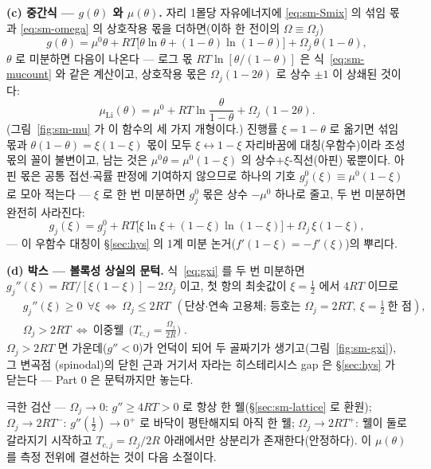 \textbf{(c) 중간식 --- $g(\theta)$ 와 $\mu(\theta)$.} 자리 1몰당 자유에너지에 \eqref{eq:sm-Smix} 의 섞임 몫과
\eqref{eq:sm-omega} 의 상호작용 몫을 더하면(이하 한 전이의 $\Omega\equiv\Omega_j$)
\begin{equation}
g(\theta)=\mu^0\theta+RT\big[\theta\ln\theta+(1-\theta)\ln(1-\theta)\big]+\Omega_j\,\theta(1-\theta),
\label{eq:sm-gtheta}
\end{equation}
$\theta$ 로 미분하면 다음이 나온다 --- 로그 몫 $RT\ln[\theta/(1-\theta)]$ 은 식~\eqref{eq:sm-mucount} 와 같은 계산이고,
상호작용 몫은 $\Omega_j(1-2\theta)$ 로 상수 $\pm1$ 이 상쇄된 것이다:
\begin{equation}
\mu_\mathrm{Li}(\theta)=\mu^0+RT\ln\frac{\theta}{1-\theta}+\Omega_j\,(1-2\theta).
\label{eq:mu}
\end{equation}
(그림~\ref{fig:sm-mu} 가 이 함수의 세 가지 개형이다.) 진행률 $\xi=1-\theta$ 로 옮기면 섞임 몫과
$\theta(1-\theta)=\xi(1-\xi)$ 몫이 모두 $\xi\leftrightarrow1-\xi$ 자리바꿈에 대칭(우함수)이라 조성 몫의 꼴이
불변이고, 남는 것은 $\mu^0\theta=\mu^0(1-\xi)$ 의 상수$+\xi$-직선(아핀) 몫뿐이다. 아핀 몫은 공통
접선$\cdot$곡률 판정에 기여하지 않으므로 하나의 기호 $g_j^0(\xi)\equiv\mu^0(1-\xi)$ 로 모아 적는다 ---
$\xi$ 로 한 번 미분하면 $g_j^0$ 몫은 상수 $-\mu^0$ 하나로 줄고, 두 번 미분하면 완전히 사라진다:
\begin{equation}
g_j(\xi)=g_j^0+RT\big[\xi\ln\xi+(1-\xi)\ln(1-\xi)\big]+\Omega_j\,\xi(1-\xi),
\label{eq:gxi}
\end{equation}
--- 이 우함수 대칭이 \S\ref{sec:hys} 의 1계 미분 논거($f'(1-\xi)=-f'(\xi)$)의 뿌리다.

\textbf{(d) 박스 --- 볼록성 상실의 문턱.} 식~\eqref{eq:gxi} 를 두 번 미분하면
$g_j''(\xi)=RT/[\xi(1-\xi)]-2\Omega_j$ 이고, 첫 항의 최솟값이 $\xi=\tfrac12$ 에서 $4RT$ 이므로
\begin{equation}
\boxed{\;
\begin{aligned}
&g_j''(\xi)\ge0\ \ \forall\xi\ \Longleftrightarrow\ \Omega_j\le2RT\ \ (\text{단상·연속 고용체; 등호는 }\Omega_j{=}2RT,\ \xi{=}\tfrac12\ \text{한 점}),\\
&\Omega_j>2RT\ \Longleftrightarrow\ \text{이중웰}\ \ \Big(T_{c,j}=\frac{\Omega_j}{2R}\Big)\;.
\end{aligned}}
\label{eq:sm-thresh}
\end{equation}
$\Omega_j>2RT$ 면 가운데($g''<0$)가 언덕이 되어 두 골짜기가 생기고(그림~\ref{fig:sm-gxi}), 그 변곡점
(spinodal)의 닫힌 근과 거기서 자라는 히스테리시스 gap 은 \S\ref{sec:hys} 가 닫는다 --- Part 0 은 문턱까지만
놓는다.
\begin{verifybox}
극한 검산 --- $\Omega_j\to0$: $g''\ge4RT>0$ 로 항상 한 웰(\S\ref{sec:sm-lattice} 로 환원);
$\Omega_j\to2RT^-$: $g''(\tfrac12)\to0^+$ 로 바닥이 평탄해지되 아직 한 웰; $\Omega_j\to2RT^+$: 웰이 둘로
갈라지기 시작하고 $T_{c,j}=\Omega_j/2R$ 아래에서만 상분리가 존재한다(안정하다). 이 $\mu(\theta)$ 를 측정 전위에 결선하는
것이 다음 소절이다.
\end{verifybox}

